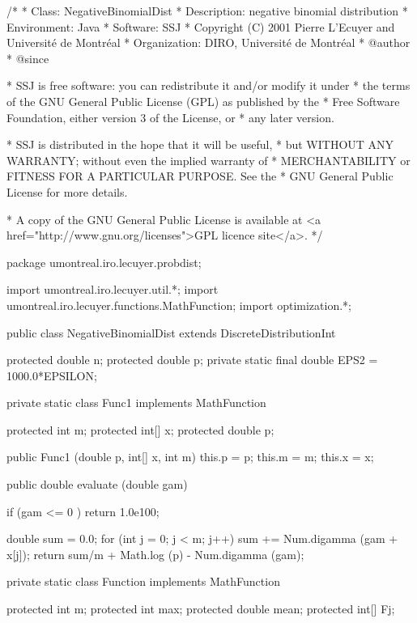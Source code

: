 \begin{code}
\begin{hide}
/*
 * Class:        NegativeBinomialDist
 * Description:  negative binomial distribution
 * Environment:  Java
 * Software:     SSJ 
 * Copyright (C) 2001  Pierre L'Ecuyer and Université de Montréal
 * Organization: DIRO, Université de Montréal
 * @author       
 * @since

 * SSJ is free software: you can redistribute it and/or modify it under
 * the terms of the GNU General Public License (GPL) as published by the
 * Free Software Foundation, either version 3 of the License, or
 * any later version.

 * SSJ is distributed in the hope that it will be useful,
 * but WITHOUT ANY WARRANTY; without even the implied warranty of
 * MERCHANTABILITY or FITNESS FOR A PARTICULAR PURPOSE.  See the
 * GNU General Public License for more details.

 * A copy of the GNU General Public License is available at
   <a href="http://www.gnu.org/licenses">GPL licence site</a>.
 */
\end{hide}
package umontreal.iro.lecuyer.probdist;
\begin{hide}
import umontreal.iro.lecuyer.util.*;
import umontreal.iro.lecuyer.functions.MathFunction;
import optimization.*;
\end{hide}

public class NegativeBinomialDist extends DiscreteDistributionInt\begin{hide} {
   protected double n;
   protected double p;
   private static final double EPS2 = 1000.0*EPSILON;

   private static class Func1 implements MathFunction {
      protected int m;
      protected int[] x;
      protected double p;

      public Func1 (double p, int[] x, int m) {
         this.p = p;
         this.m = m;
         this.x = x;
      }

      public double evaluate (double gam) {
         if (gam <= 0 ) return 1.0e100;

         double sum = 0.0;
         for (int j = 0; j < m; j++)
            sum += Num.digamma (gam + x[j]);
         return sum/m + Math.log (p) - Num.digamma (gam);
      }
   }


   private static class Function implements MathFunction {
      protected int m;
      protected int max;
      protected double mean;
      protected int[] Fj;

}}
\end{hide}
\end{code}
